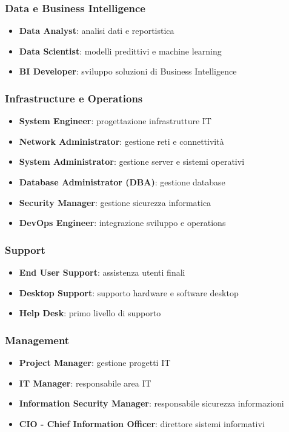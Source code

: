 \documentclass[12pt,a4paper]{article}
\begin{document}
\subsubsection{Data e Business Intelligence}
\begin{itemize}
    \item \textbf{Data Analyst}: analisi dati e reportistica
    \item \textbf{Data Scientist}: modelli predittivi e machine learning
    \item \textbf{BI Developer}: sviluppo soluzioni di Business Intelligence
\end{itemize}

\subsubsection{Infrastructure e Operations}
\begin{itemize}
    \item \textbf{System Engineer}: progettazione infrastrutture IT
    \item \textbf{Network Administrator}: gestione reti e connettività
    \item \textbf{System Administrator}: gestione server e sistemi operativi
    \item \textbf{Database Administrator (DBA)}: gestione database
    \item \textbf{Security Manager}: gestione sicurezza informatica
    \item \textbf{DevOps Engineer}: integrazione sviluppo e operations
\end{itemize}

\subsubsection{Support}
\begin{itemize}
    \item \textbf{End User Support}: assistenza utenti finali
    \item \textbf{Desktop Support}: supporto hardware e software desktop
    \item \textbf{Help Desk}: primo livello di supporto
\end{itemize}

\subsubsection{Management}
\begin{itemize}
    \item \textbf{Project Manager}: gestione progetti IT
    \item \textbf{IT Manager}: responsabile area IT
    \item \textbf{Information Security Manager}: responsabile sicurezza informazioni
    \item \textbf{CIO - Chief Information Officer}: direttore sistemi informativi
\end{itemize}
\end{document}

